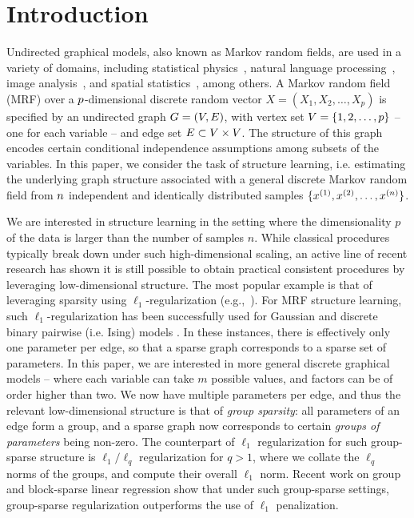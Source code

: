 \section{Introduction}

 Undirected graphical models, also known as Markov random fields, are used in a variety of domains, including statistical
physics~\citep{Ising25}, natural language processing~\citep{Manning:99}, image analysis~\citep{Woods78,Hassner80,Cross83}, and spatial
statistics~\citep{Ripley81}, among others. A Markov random field (MRF) over a $p$-dimensional discrete random vector $X = (X_1, X_2,\ldots,X_p)$ is specified by an undirected graph $G = (V, E)$, with vertex set $V = \{1, 2, \ldots, p \}$ -- one for each variable -- and edge set $E \subset V \times V$.  The structure of this graph encodes certain conditional independence assumptions among subsets of the variables. In this paper, we consider the task of structure learning, i.e.  estimating the underlying graph structure associated with a general discrete Markov random field from $n$ independent and identically distributed samples $\{ x^{(1)}, x^{(2)}, \ldots, x^{(n)} \}$.

 We are interested in structure learning in the setting where the dimensionality $p$ of the data is larger than the number of samples $n$. While classical procedures typically break down under such high-dimensional scaling, an active line of recent research has shown it is still possible to obtain practical consistent procedures by leveraging low-dimensional structure. The most popular example is that of leveraging sparsity using $\ell_1$-regularization (e.g.,~\cite{CandesTao06,Donoho:Elad:03,Meinshausen:06,ng:04,Tropp:06,Wainwright06_new,ZhaoYu06}). For MRF structure learning, such $\ell_1$-regularization has been successfully used for Gaussian \cite{Meinshausen:06} and discrete binary pairwise (i.e. Ising) models \citep{RWLIsing,LeeKoller07}. In these instances, there is effectively only one parameter per edge, so that a sparse graph corresponds to a sparse set of parameters. In this paper, we are interested in more general discrete graphical models -- where each variable can take $m$ possible values, and factors can be of order higher than two. We now have multiple parameters per edge, and thus the relevant low-dimensional structure is that of {\em group sparsity}: all parameters of an edge form a group, and a sparse graph now corresponds to certain \emph{groups of parameters} being non-zero. The counterpart of $\ell_1$ regularization for such group-sparse structure is $\ell_1/\ell_q$ regularization for $q > 1$, where we collate the $\ell_q$ norms of the groups, and compute their overall $\ell_1$ norm. Recent work on group and block-sparse linear regression \citep{TurlachVW, ZH08,NWJoint,Lounici09,Obozinski10,RLLWSPAM,BachMKL} show that under such group-sparse settings, group-sparse regularization outperforms the use of $\ell_1$ penalization.

